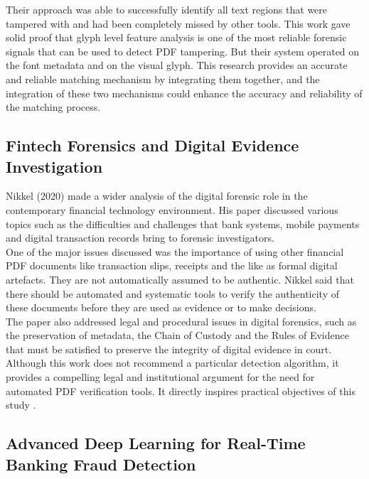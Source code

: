 \noindent Their approach was able to successfully identify all text regions that were tampered with and had been completely missed by other tools. This work gave solid proof that glyph level feature analysis is one of the most reliable forensic signals that can be used to detect PDF tampering. But their system operated on the font metadata and on the visual glyph. This research provides an accurate and reliable matching mechanism by integrating them together, and the integration of these two mechanisms could enhance the accuracy and reliability of the matching process.

\subsection{Fintech Forensics and Digital Evidence Investigation}

\noindent Nikkel (2020) made a wider analysis of the digital forensic role in the contemporary financial technology environment. His paper discussed various topics such as the difficulties and challenges that bank systems, mobile payments and digital transaction records bring to forensic investigators.\\

\noindent One of the major issues discussed was the importance of using other financial PDF documents like transaction slips, receipts and the like as formal digital artefacts. They are not automatically assumed to be authentic. Nikkel said that there should be automated and systematic tools to verify the authenticity of these documents before they are used as evidence or to make decisions.\\

\noindent The paper also addressed legal and procedural issues in digital forensics, such as the preservation of metadata, the Chain of Custody and the Rules of Evidence that must be satisfied to preserve the integrity of digital evidence in court. Although this work does not recommend a particular detection algorithm, it provides a compelling legal and institutional argument for the need for automated PDF verification tools. It directly inspires practical objectives of this study \cite{Nikkel2020Fintech}.\\

\subsection{Advanced Deep Learning for Real-Time Banking Fraud Detection}

